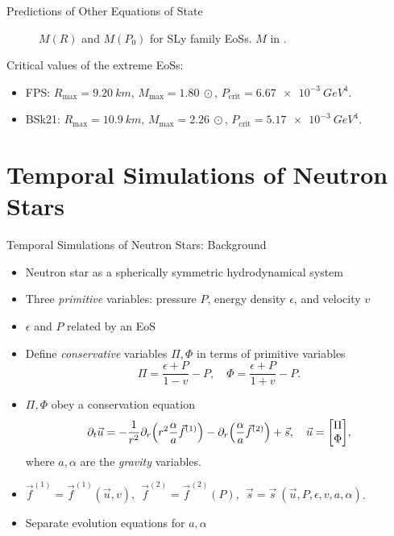 \documentclass[]{beamer}
\newcommand{\p}{\partial}
\begin{document}
\begin{frame}{Predictions of Other Equations of State}
\begin{figure}[h!]
\begin{subfigure}{.5\textwidth}
            \end{subfigure}
            \caption[]{$M(R)$ and $M(P_0)$ for SLy family EoSs. $M$ in \SI{}{\odot}.}
        \end{figure} \pause
        \vspace{-10pt}
        Critical values of the extreme EoSs: \pause
        \begin{itemize}
            \item FPS: $R_\text{max} = \SI{9.20}{km}$, $M_\text{max} = \SI{1.80}{\odot}$, $P_\text{crit} = \SI{6.67e-3}{GeV^4}.$
            \item BSk21: $R_\text{max} = \SI{10.9}{km}$, $M_\text{max} = \SI{2.26}{\odot}$, $P_\text{crit} = \SI{5.17e-3}{GeV^4}.$
        \end{itemize}

    \end{frame}

    \section{Temporal Simulations of Neutron Stars}

    \begin{frame}{Temporal Simulations of Neutron Stars: Background}
        \begin{itemize}
            \pause
            \item Neutron star as a spherically symmetric hydrodynamical system \pause
            \item Three \textit{primitive} variables: pressure $P$, energy density $\epsilon$, and velocity $v$ \pause
            \item $\epsilon$ and $P$ related by an EoS \pause
            \item Define \textit{conservative} variables $\Pi, \Phi$ in terms of primitive variables
            \[\Pi = \frac{\epsilon + P}{1-v} - P, \quad \Phi = \frac{\epsilon + P}{1+v} - P.\] \pause
            \vspace{-15pt}
            \item $\Pi, \Phi$ obey a conservation equation
            \[\p_t \vec{u} = -\frac{1}{r^2}\p_r\pqty{r^2\frac{\alpha}{a}\vec{f}^{(1)}} - \p_r\qty(\frac{\alpha}{a}\vec{f}^{(2)})+\vec{s}, \quad \vec{u} = \mqty[\Pi\\\Phi],\]
            where $a,\alpha$ are the \textit{gravity} variables. \pause
            \item $\vec{f}^{(1)} = \vec{f}^{(1)} (\vec{u}, v),~~ \vec{f}^{(2)} = \vec{f}^{(2)}(P),~~ \vec{s} = \vec{s}~(\vec{u},P,\epsilon,v,a,\alpha)$. \pause
            \item Separate evolution equations for $a,\alpha$
        \end{itemize}
    \end{frame}
\end{document}
